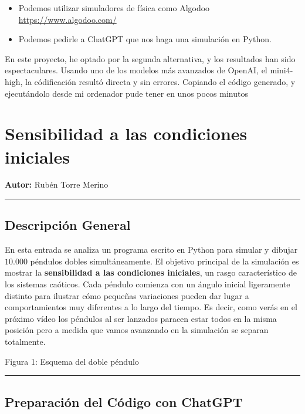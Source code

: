 \documentclass[
  11pt,
  a4paper,
  DIV=11,
  numbers=noendperiod]{scrreprt}
\providecommand{\tightlist}{%
  \setlength{\itemsep}{0pt}\setlength{\parskip}{0pt}}
\begin{document}
\begin{itemize}
\tightlist
\item
  Podemos utilizar simuladores de física como Algodoo
  \url{https://www.algodoo.com/}
\item
  Podemos pedirle a ChatGPT que nos haga una simulación en Python.
\end{itemize}

En este proyecto, he optado por la segunda alternativa, y los resultados
han sido espectaculares. Usando uno de los modelos más avanzados de
OpenAI, el mini4-high, la códificación resultó directa y sin errores.
Copiando el código generado, y ejecutándolo desde mi ordenador pude
tener en unos pocos minutos

\chapter{Sensibilidad a las condiciones
iniciales}\label{sensibilidad-a-las-condiciones-iniciales}

\textbf{Autor:} Rubén Torre Merino

\begin{center}\rule{0.5\linewidth}{0.5pt}\end{center}

\section{Descripción General}\label{descripciuxf3n-general}

En esta entrada se analiza un programa escrito en Python para simular y
dibujar \(10.000\) péndulos dobles simultáneamente. El objetivo
principal de la simulación es mostrar la \textbf{sensibilidad a las
condiciones iniciales}, un rasgo característico de los sistemas
caóticos. Cada péndulo comienza con un ángulo inicial ligeramente
distinto para ilustrar cómo pequeñas variaciones pueden dar lugar a
comportamientos muy diferentes a lo largo del tiempo. Es decir, como
verás en el próximo vídeo los péndulos al ser lanzados paracen estar
todos en la misma posición pero a medida que vamos avanzando en la
simulación se separan totalmente.

Figura 1: Esquema del doble péndulo

\begin{center}\rule{0.5\linewidth}{0.5pt}\end{center}

\section{Preparación del Código con
ChatGPT}\label{preparaciuxf3n-del-cuxf3digo-con-chatgpt}
\end{document}

